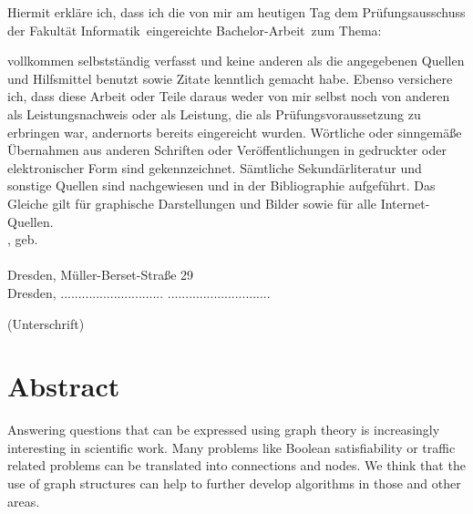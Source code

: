 \documentclass[a4paper, 12pt, bibliography=totoc]{scrartcl}
\begin{document}
\noindent
 Hiermit erkl\"{a}re ich, dass ich die von mir am heutigen Tag dem Pr\"{u}fungsausschuss der Fakult\"{a}t Informatik~eingereichte Bachelor-Arbeit~zum Thema:
\begin{center}
	\textit{\mytitle}
\end{center}

vollkommen selbstst\"{a}ndig verfasst und keine anderen als die angegebenen Quellen und Hilfsmittel benutzt sowie Zitate kenntlich gemacht habe. Ebenso versichere ich, dass diese Arbeit
oder Teile daraus weder von mir selbst noch von anderen als Leistungsnachweis oder als Leistung, die als Prüfungsvoraussetzung
zu erbringen war, andernorts bereits eingereicht wurden. Wörtliche oder sinngemäße Übernahmen aus anderen Schriften
oder Veröffentlichungen in gedruckter oder elektronischer Form sind gekennzeichnet.
Sämtliche Sekundärliteratur und sonstige Quellen sind nachgewiesen und in der Bibliographie aufgeführt.
Das Gleiche gilt für graphische Darstellungen und Bilder sowie für alle Internet-Quellen. \\[20pt]

\noindent
\myauthor, geb. \mybirthday \\\\
 Dresden, Müller-Berset-Straße 29\\[80pt]


Dresden,  ............................. \hfill .............................
\begin{flushright}
	(Unterschrift)\hspace{1em}
\end{flushright}


\newpage

\section*{Abstract}
\vspace{4ex}

Answering questions that can be expressed using graph theory is increasingly interesting in scientific work.
Many problems like Boolean satisfiability or traffic related problems can be translated into connections and nodes.
We think that the use of graph structures can help to further develop algorithms in those and other areas.
\end{document}
